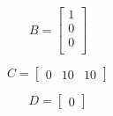 \documentclass[a4paper, 10pt]{article}
\begin{document}
\begin{list}{\textbf{Questão .}}{
\setlength{\labelwidth}{-2mm} \setlength{\parsep}{0mm}
\setlength{\topsep}{0mm} \setlength{\leftmargin}{0mm}}
            $$
            B = \left[\begin{array}{r}
                1 \\
                0 \\
                0 \\
            \end{array}\right]
            $$

            $$
            C = \left[\begin{array}{rrr}
                0 & 10 & 10
               \end{array}\right]
            $$

            $$
            D = \left[\begin{array}{r}
                0 
               \end{array}\right]
            $$



\end{list}
\end{document}
